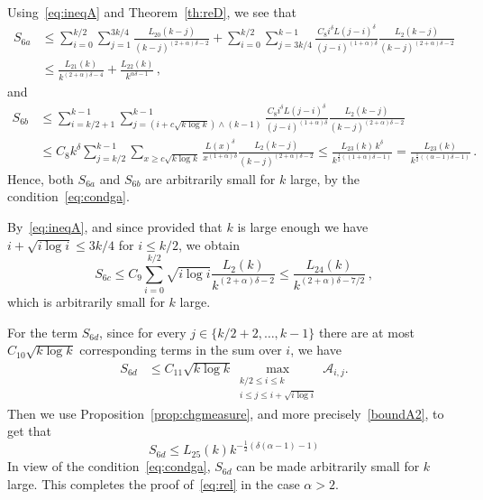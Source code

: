 \documentclass[AHL,Unicode,longabstracts]{cedram}
\newcommand{\ga}{\alpha}
\newcommand{\gd}{\delta}
\newcommand{\cA}{\ensuremath{\mathcal{A}}}
\newcommand{\maxtwo}[2]{\max_{\substack{#1 \\ #2}}}
\begin{document}
Using~\eqref{eq:ineqA} and Theorem~\ref{th:reD}, we see that
\begin{equation}
\begin{split}
S_{6a} & \le \sum_{i=0}^{ k/2 } \sum_{j= 1}^{ 3k/4} \frac{L_{20}(k-j)}{(k-j)^{(2+\ga)\delta -2}} + \sum_{i=0}^{k/2 } \sum_{j= 3k/4}^{k-1} \frac{C_8 i^{\gd} L(j-i)^{\gd}}{(j-i)^{(1+\ga) \delta}} \frac{L_{2}(k-j)}{(k-j)^{(2+\ga)\delta -2}} \\
& \le \frac{L_{21}(k)}{k^{(2+\ga)\delta -4}} + \frac{L_{22}(k)}{k^{\ga \delta -1}}\,,
\end{split}
\end{equation}
and
\begin{align*}
S_{6b} &\le \sum_{i= k/2 +1}^{k-1} \sum_{j=(i +c\sqrt{k\log k}) \wedge (k-1)}^{k-1} \frac{C_8 i^{\gd} L(j-i)^{\gd}}{(j-i)^{(1+\ga) \delta}} \frac{L_{2}(k-j)}{(k-j)^{(2+\ga)\delta -2}} \\
&\le C_8 k^{\gd} \sum_{j=k/2}^{k-1} \sum_{x\geq c \sqrt{k\log k}} \frac{L(x)^{\gd}}{ x^{(1+\ga) \gd}} \frac{L_{2}(k-j)}{(k-j)^{(2+\ga)\delta -2}} \leq \frac{L_{23}(k)\,k^{\gd}}{ k^{\tfrac12 ((1+\ga)\gd-1)}} = \frac{L_{23}(k)}{ k^{\tfrac12((\ga-1)\gd-1)}}\,.
\end{align*}
Hence, both $S_{6a}$ and $S_{6b}$ are arbitrarily small for $k$ large, by the condition~\eqref{eq:condga}.

By~\eqref{eq:ineqA}, and since provided that $k$ is large enough we have $i+\sqrt{i\log i}\leq 3k/4$ for $i\leq k/2$, we obtain
\begin{equation}
S_{6c} \le C_9 \sum_{i=0}^{ k/2 } \sqrt{i\log i} \frac{L_{2}(k)}{k^{(2+\ga)\delta -2}} \le \frac{L_{24}(k)}{ k^{(2+\ga)\delta - 7/2 } }\,,
\end{equation}
which is arbitrarily small for $k$ large.

For the term $S_{6d}$, since for every $j\in \{k/2+2,\ldots, k-1\}$ there are at most $C_{10} \sqrt{k\log k}$ corresponding terms in the sum over $i$, we have
\begin{align}\label{eq:S6d}
S_{6d} & \le C_{11} \sqrt{k\log k} \maxtwo{ k/2 \le i \le k}{i \le j \le i+ \sqrt{i \log i} } \cA_{i,j}.
\end{align}
Then we use Proposition~\ref{prop:chgmeasure}, and more precisely~\eqref{boundA2}, to get that
\begin{equation}
S_{6d} \le L_{25}(k) k^{- \frac12 (\gd (\ga-1)-1)}
\end{equation}
In view of the condition~\eqref{eq:condga}, $S_{6d}$ can be made arbitrarily small for $k$ large. This completes the proof of~\eqref{eq:rel} in the case $\ga>2$.
\end{document}
